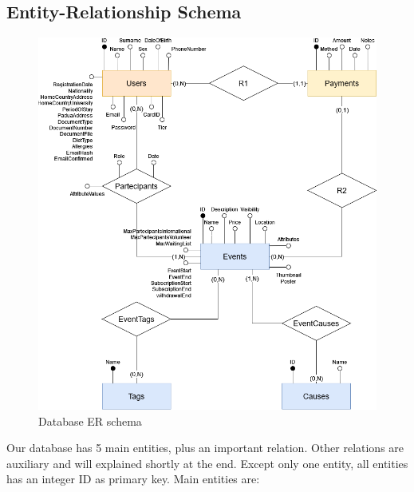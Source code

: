 \subsection{Entity-Relationship Schema}
\begin{figure}[h!]
    \centering
    \includegraphics[width=1\textwidth]{images/ERSchema.png}
    \caption{Database ER schema}
    \label{fig:er_schema}
\end{figure}
Our database has 5 main entities, plus an important relation. Other relations are auxiliary
and will explained shortly at the end. Except only one entity, all entities has an integer ID
as primary key. Main entities are:
